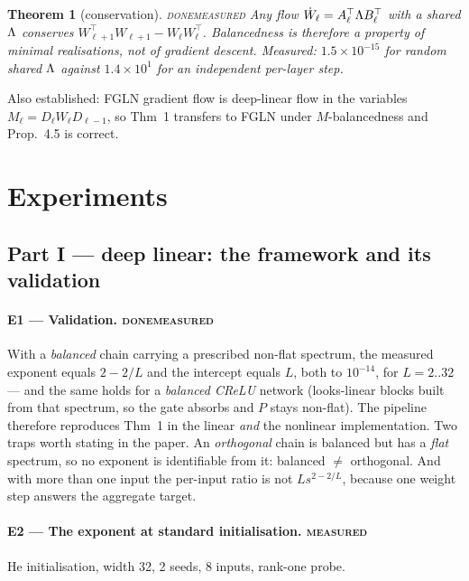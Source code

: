 \documentclass{article}
\newcommand{\OK}{{\color{green!50!black}\textsc{done}}}
\newcommand{\RUN}{{\color{blue!70!black}\textsc{measured}}}
\newcommand{\NOTE}[1]{{\color{gray}\small #1}}
\theoremstyle{plain}\newtheorem{theorem}{Theorem}\newtheorem{lemma}[theorem]{Lemma}
\theoremstyle{definition}\newtheorem{definition}[theorem]{Definition}
\begin{document}
\begin{theorem}[conservation]\label{thm:conserve}\OK{}\RUN{}
Any flow $\dot W_\ell=A_\ell^\top\Lambda B_\ell^\top$ with a \emph{shared} $\Lambda$ conserves
$W_{\ell+1}^\top W_{\ell+1}-W_\ell W_\ell^\top$. Balancedness
\cite{du2018algorithmic,arora2018optimization} is therefore a property of minimal realisations,
not of gradient descent. \NOTE{Measured: $1.5\times10^{-15}$ for random shared $\Lambda$ against
$1.4\times10^{1}$ for an independent per-layer step.}
\end{theorem}

\NOTE{Also established: FGLN gradient flow is deep-linear flow in the variables
$M_\ell=D_\ell W_\ell D_{\ell-1}$, so \cite{arora2018optimization} Thm~1 transfers to FGLN under
$M$-balancedness and \cite{haas2026why} Prop.~4.5 is correct.}

\section{Experiments}\label{sec:exp}

\subsection*{Part I --- deep linear: the framework and its validation}

\paragraph{E1 --- Validation. \OK{}\RUN{}}
With a \emph{balanced} chain carrying a prescribed non-flat spectrum, the measured exponent equals
$2-2/L$ and the intercept equals $L$, both to $10^{-14}$, for $L=2..32$ --- and the same holds for
a \emph{balanced CReLU} network (looks-linear blocks built from that spectrum, so the gate absorbs
and $P$ stays non-flat). The pipeline therefore reproduces \cite{arora2018optimization} Thm~1 in
the linear \emph{and} the nonlinear implementation.
\NOTE{Two traps worth stating in the paper. An \emph{orthogonal} chain is balanced but has a
\emph{flat} spectrum, so no exponent is identifiable from it: balanced $\neq$ orthogonal. And with
more than one input the per-input ratio is not $Ls^{2-2/L}$, because one weight step answers the
aggregate target.}

\paragraph{E2 --- The exponent at standard initialisation. \RUN{}}
He initialisation, width 32, 2 seeds, 8 inputs, rank-one probe.
\end{document}
